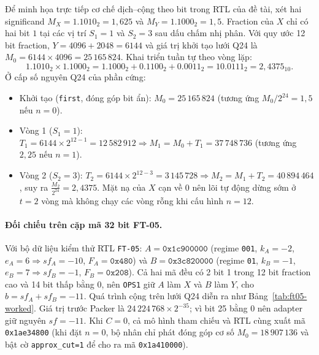 Để minh họa trực tiếp cơ chế dịch--cộng theo bit trong RTL của đề tài, xét hai
significand $M_X = 1.1010_2 = 1{,}625$ và $M_Y = 1.1000_2 = 1{,}5$. Fraction của
$X$ chỉ có hai bit $1$ tại các vị trí $S_1 = 1$ và $S_2 = 3$ sau dấu chấm nhị phân.
Với quy ước 12 bit fraction, $Y = 4096 + 2048 = 6144$ và giá trị khởi tạo lưới
Q24 là $M_0 = 6144 \times 4096 = 25\,165\,824$. Khai triển tuần tự theo vòng lặp:
\[
1.1010_2 \times 1.1000_2 = 1.1000_2 + 0.1100_2 + 0.0011_2 = 10.0111_2 = 2{,}4375_{10}.
\]
Ở cấp số nguyên Q24 của phần cứng:
\begin{itemize}
  \item Khởi tạo (\texttt{first}, đóng góp bit ẩn): $M_0 = 25\,165\,824$ (tương ứng $M_0/2^{24} = 1{,}5$ nếu $n=0$).
  \item Vòng 1 ($S_1 = 1$): $T_1 = 6144 \times 2^{12-1} = 12\,582\,912 \Rightarrow M_1 = M_0 + T_1 = 37\,748\,736$ (tương ứng $2{,}25$ nếu $n=1$).
  \item Vòng 2 ($S_2 = 3$): $T_2 = 6144 \times 2^{12-3} = 3\,145\,728 \Rightarrow M_2 = M_1 + T_2 = 40\,894\,464$, suy ra $\frac{M_2}{2^{24}} = 2{,}4375$. Mặt nạ của $X$ cạn về $0$ nên lõi tự động dừng sớm ở $t=2$ vòng mà không chạy các vòng rỗng khi cấu hình $n=12$.
\end{itemize}

\paragraph{Đối chiếu trên cặp mã 32 bit FT-05.}
Với bộ dữ liệu kiểm thử RTL \texttt{FT-05}: $A = \texttt{0x1c900000}$ (regime
\texttt{001}, $k_A=-2$, $e_A=6 \Rightarrow sf_A=-10$, $F_A = \texttt{0x480}$) và
$B = \texttt{0x3c820000}$ (regime \texttt{01}, $k_B=-1$, $e_B=7 \Rightarrow sf_B=-1$,
$F_B = \texttt{0x208}$). Cả hai mã đều có 2 bit 1 trong 12 bit fraction cao và
14 bit thấp bằng 0, nên \texttt{OPS1} giữ $A$ làm $X$ và $B$ làm $Y$, cho $b = sf_A + sf_B = -11$.
Quá trình cộng trên lưới Q24 diễn ra như Bảng~\ref{tab:ft05-worked}. Giá trị trước
Packer là $24\,224\,768 \times 2^{-35}$; vì bit 25 bằng 0 nên adapter giữ nguyên
$sf = -11$. Khi $C=0$, cả mô hình tham chiếu và RTL cùng xuất mã \texttt{0x1ae34800}
(khi đặt $n=0$, bộ nhân chỉ phát đóng góp cơ số $M_0 = 18\,907\,136$ và bật cờ
\texttt{approx\_cut=1} để cho ra mã \texttt{0x1a410000}).

